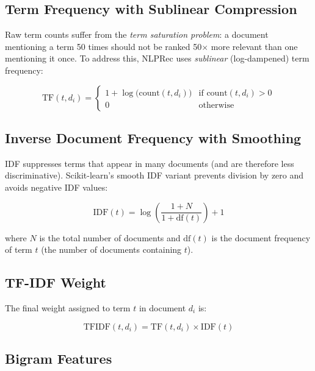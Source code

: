 \documentclass[12pt, a4paper]{article}
\begin{document}
\subsection{Term Frequency with Sublinear Compression}

Raw term counts suffer from the \textit{term saturation problem}: a document mentioning a term
50 times should not be ranked 50$\times$ more relevant than one mentioning it once. To address
this, NLPRec uses \textit{sublinear} (log-dampened) term frequency:

\begin{equation}
    \mathrm{TF}(t, d_i) =
    \begin{cases}
        1 + \log\bigl(\text{count}(t, d_i)\bigr) & \text{if } \text{count}(t, d_i) > 0 \\
        0 & \text{otherwise}
    \end{cases}
    \label{eq:tf}
\end{equation}

\subsection{Inverse Document Frequency with Smoothing}

IDF suppresses terms that appear in many documents (and are therefore less discriminative).
Scikit-learn's smooth IDF variant prevents division by zero and avoids negative IDF values:

\begin{equation}
    \mathrm{IDF}(t) = \log\!\left(\frac{1 + N}{1 + \mathrm{df}(t)}\right) + 1
    \label{eq:idf}
\end{equation}

where $N$ is the total number of documents and $\mathrm{df}(t)$ is the document frequency of term
$t$ (the number of documents containing $t$).

\subsection{TF-IDF Weight}

The final weight assigned to term $t$ in document $d_i$ is:

\begin{equation}
    \mathrm{TFIDF}(t, d_i) = \mathrm{TF}(t, d_i) \times \mathrm{IDF}(t)
    \label{eq:tfidf}
\end{equation}

\subsection{Bigram Features}
\end{document}

